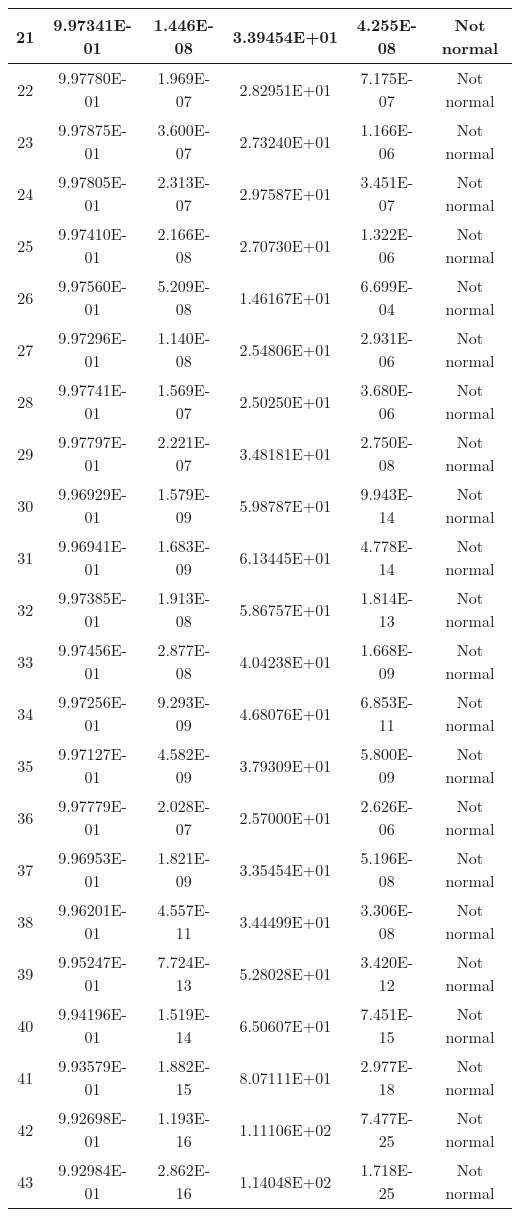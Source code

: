 \begin{table}[h]
\begin{tabular}{|c|c|c|c|c|c|}
		21 & 9.97341E-01 & 1.446E-08 & 3.39454E+01 & 4.255E-08 & Not normal\\\hline
		22 & 9.97780E-01 & 1.969E-07 & 2.82951E+01 & 7.175E-07 & Not normal\\\hline
		23 & 9.97875E-01 & 3.600E-07 & 2.73240E+01 & 1.166E-06 & Not normal\\\hline
		24 & 9.97805E-01 & 2.313E-07 & 2.97587E+01 & 3.451E-07 & Not normal\\\hline
		25 & 9.97410E-01 & 2.166E-08 & 2.70730E+01 & 1.322E-06 & Not normal\\\hline
		26 & 9.97560E-01 & 5.209E-08 & 1.46167E+01 & 6.699E-04 & Not normal\\\hline
		27 & 9.97296E-01 & 1.140E-08 & 2.54806E+01 & 2.931E-06 & Not normal\\\hline
		28 & 9.97741E-01 & 1.569E-07 & 2.50250E+01 & 3.680E-06 & Not normal\\\hline
		29 & 9.97797E-01 & 2.221E-07 & 3.48181E+01 & 2.750E-08 & Not normal\\\hline
		30 & 9.96929E-01 & 1.579E-09 & 5.98787E+01 & 9.943E-14 & Not normal\\\hline
		31 & 9.96941E-01 & 1.683E-09 & 6.13445E+01 & 4.778E-14 & Not normal\\\hline
		32 & 9.97385E-01 & 1.913E-08 & 5.86757E+01 & 1.814E-13 & Not normal\\\hline
		33 & 9.97456E-01 & 2.877E-08 & 4.04238E+01 & 1.668E-09 & Not normal\\\hline
		34 & 9.97256E-01 & 9.293E-09 & 4.68076E+01 & 6.853E-11 & Not normal\\\hline
		35 & 9.97127E-01 & 4.582E-09 & 3.79309E+01 & 5.800E-09 & Not normal\\\hline
		36 & 9.97779E-01 & 2.028E-07 & 2.57000E+01 & 2.626E-06 & Not normal\\\hline
		37 & 9.96953E-01 & 1.821E-09 & 3.35454E+01 & 5.196E-08 & Not normal\\\hline
		38 & 9.96201E-01 & 4.557E-11 & 3.44499E+01 & 3.306E-08 & Not normal\\\hline
		39 & 9.95247E-01 & 7.724E-13 & 5.28028E+01 & 3.420E-12 & Not normal\\\hline
		40 & 9.94196E-01 & 1.519E-14 & 6.50607E+01 & 7.451E-15 & Not normal\\\hline
		41 & 9.93579E-01 & 1.882E-15 & 8.07111E+01 & 2.977E-18 & Not normal\\\hline
		42 & 9.92698E-01 & 1.193E-16 & 1.11106E+02 & 7.477E-25 & Not normal\\\hline
		43 & 9.92984E-01 & 2.862E-16 & 1.14048E+02 & 1.718E-25 & Not normal\\\hline

\end{tabular}
\end{table}
